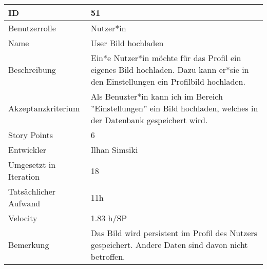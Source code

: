 \begin{tabularx}{\textwidth}{|p{}|X|}
	\hline
	ID & 51\\
	\hline
	Benutzerrolle & Nutzer*in\\
	\hline
	Name & User Bild hochladen\\
	\hline
	Beschreibung & Ein*e Nutzer*in möchte für das Profil ein eigenes Bild hochladen. Dazu kann er*sie in den Einstellungen ein Profilbild hochladen.\\
	\hline
	Akzeptanzkriterium & Als Benuzter*in kann ich im Bereich ''Einstellungen'' ein Bild hochladen, welches in der Datenbank gespeichert wird.\\
	\hline
	Story Points & 6\\
	\hline
	Entwickler & Ilhan Simsiki\\
	\hline
	Umgesetzt in Iteration & 18\\
	\hline
	Tatsächlicher Aufwand & 11h\\
	\hline
	Velocity & 1.83 h/SP\\
	\hline
	Bemerkung & Das Bild wird persistent im Profil des Nutzers gespeichert. Andere Daten sind davon nicht betroffen.\\
	\hline
\end{tabularx}
\vspace{20pt}
